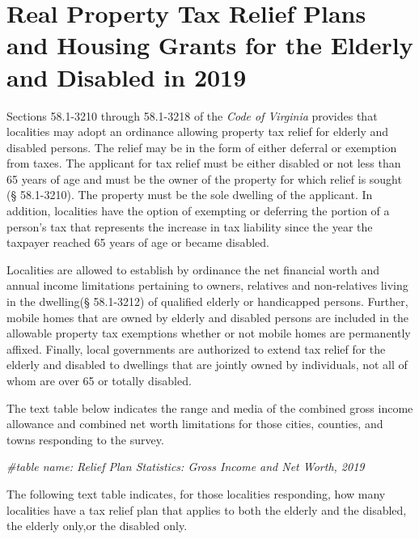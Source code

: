 \documentclass[
]{book}
\newenvironment{Shaded}{\begin{snugshade}}{\end{snugshade}}
\newcommand{\CommentTok}[1]{\textcolor[rgb]{0.56,0.35,0.01}{\textit{#1}}}
\begin{document}
\hypertarget{real-property-tax-relief-plans-and-housing-grants-for-the-elderly-and-disabled-in-2019}{%
\chapter{Real Property Tax Relief Plans and Housing Grants for the Elderly and Disabled in 2019}\label{real-property-tax-relief-plans-and-housing-grants-for-the-elderly-and-disabled-in-2019}}

Sections 58.1-3210 through 58.1-3218 of the \emph{Code of Virginia} provides that localities may adopt an ordinance allowing property tax relief for elderly and disabled persons. The relief may be in the form of either deferral or exemption from taxes. The applicant for tax relief must be either disabled or not less than 65 years of age and must be the owner of the property for which relief is sought (§ 58.1-3210). The property must be the sole dwelling of the applicant. In addition, localities have the option of exempting or deferring the portion of a person's tax that represents the increase in tax liability since the year the taxpayer reached 65 years of age or became disabled.

Localities are allowed to establish by ordinance the net financial worth and annual income limitations pertaining to owners, relatives and non-relatives living in the dwelling(§ 58.1-3212) of qualified elderly or handicapped persons. Further, mobile homes that are owned by elderly and disabled persons are included in the allowable property tax exemptions whether or not mobile homes are permanently affixed. Finally, local governments are authorized to extend tax relief for the elderly and disabled to dwellings that are jointly owned by individuals, not all of whom are over 65 or totally disabled.

The text table below indicates the range and media of the combined gross income allowance and combined net worth limitations for those cities, counties, and towns responding to the survey.

\begin{Shaded}
\begin{Highlighting}[]
\CommentTok{\#table name: Relief Plan Statistics: Gross Income and Net Worth, 2019}
\end{Highlighting}
\end{Shaded}

The following text table indicates, for those localities responding, how many localities have a tax relief plan that applies to both the elderly and the disabled, the elderly only,or the disabled only.
\end{document}
